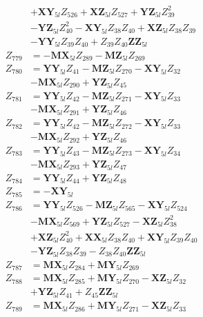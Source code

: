 \begin{multicols}{2}
\begin{align}
&+ \mathbf{XY}_{5l}Z_{526} + \mathbf{XZ}_{5l}Z_{527} + \mathbf{YZ}_{5l}Z_{39}^2  \nonumber \\
&- \mathbf{YZ}_{5l}Z_{40}^2 - \mathbf{XY}_{5l}Z_{38}Z_{40} + \mathbf{XZ}_{5l}Z_{38}Z_{39}  \nonumber \\
&- \mathbf{YY}_{5l}Z_{39}Z_{40} + Z_{39}Z_{40}\mathbf{ZZ}_{5l} \nonumber \\
Z_{779} &= - \mathbf{MX}_{5l}Z_{289} - \mathbf{MZ}_{5l}Z_{269} \nonumber \\
Z_{780} &= \mathbf{YY}_{5l}Z_{41} - \mathbf{MZ}_{5l}Z_{270} - \mathbf{XY}_{5l}Z_{32}  \nonumber \\
&- \mathbf{MX}_{5l}Z_{290} + \mathbf{YZ}_{5l}Z_{45} \nonumber \\
Z_{781} &= \mathbf{YY}_{5l}Z_{42} - \mathbf{MZ}_{5l}Z_{271} - \mathbf{XY}_{5l}Z_{33}  \nonumber \\
&- \mathbf{MX}_{5l}Z_{291} + \mathbf{YZ}_{5l}Z_{46} \nonumber \\
Z_{782} &= \mathbf{YY}_{5l}Z_{42} - \mathbf{MZ}_{5l}Z_{272} - \mathbf{XY}_{5l}Z_{33}  \nonumber \\
&- \mathbf{MX}_{5l}Z_{292} + \mathbf{YZ}_{5l}Z_{46} \nonumber \\
Z_{783} &= \mathbf{YY}_{5l}Z_{43} - \mathbf{MZ}_{5l}Z_{273} - \mathbf{XY}_{5l}Z_{34}  \nonumber \\
&- \mathbf{MX}_{5l}Z_{293} + \mathbf{YZ}_{5l}Z_{47} \nonumber \\
Z_{784} &= \mathbf{YY}_{5l}Z_{44} + \mathbf{YZ}_{5l}Z_{48} \nonumber \\
Z_{785} &= -\mathbf{XY}_{5l} \nonumber \\
Z_{786} &= \mathbf{YY}_{5l}Z_{526} - \mathbf{MZ}_{5l}Z_{565} - \mathbf{XY}_{5l}Z_{524}  \nonumber \\
&- \mathbf{MX}_{5l}Z_{569} + \mathbf{YZ}_{5l}Z_{527} - \mathbf{XZ}_{5l}Z_{38}^2  \nonumber \\
&+ \mathbf{XZ}_{5l}Z_{40}^2 + \mathbf{XX}_{5l}Z_{38}Z_{40} + \mathbf{XY}_{5l}Z_{39}Z_{40}  \nonumber \\
&- \mathbf{YZ}_{5l}Z_{38}Z_{39} - Z_{38}Z_{40}\mathbf{ZZ}_{5l} \nonumber \\
Z_{787} &= \mathbf{MX}_{5l}Z_{284} + \mathbf{MY}_{5l}Z_{269} \nonumber \\
Z_{788} &= \mathbf{MX}_{5l}Z_{285} + \mathbf{MY}_{5l}Z_{270} - \mathbf{XZ}_{5l}Z_{32}  \nonumber \\
&+ \mathbf{YZ}_{5l}Z_{41} + Z_{45}\mathbf{ZZ}_{5l} \nonumber \\
Z_{789} &= \mathbf{MX}_{5l}Z_{286} + \mathbf{MY}_{5l}Z_{271} - \mathbf{XZ}_{5l}Z_{33}  \nonumber \\

\end{align}
\end{multicols}
